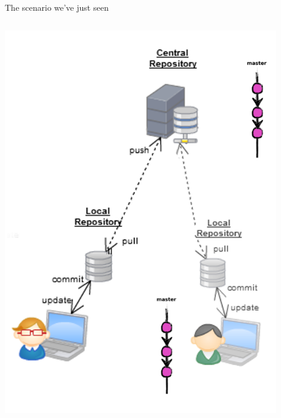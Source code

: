 \begin{frame}[fragile]{The scenario we've just seen}
\begin{columns}
\begin{column}{0.4\textwidth}
\begin{center}
{			}\only<8> {
				\includegraphics[width=0.9\textwidth]{branch_many.png}
			}
	\end{center}
\end{column}
\end{columns}

\end{frame}


